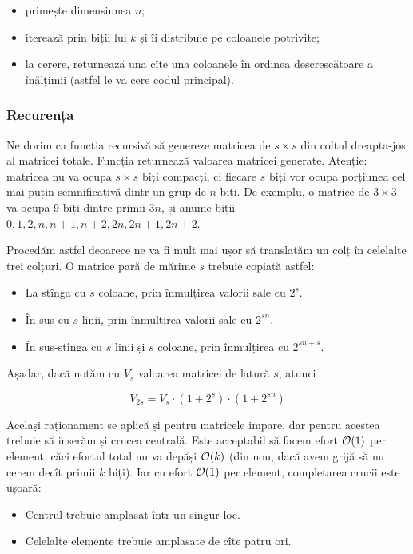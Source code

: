 \documentclass[../main.tex]{subfiles}
\begin{document}
\begin{itemize}
  \item primește dimensiunea $n$;
  \item iterează prin biții lui $k$ și îi distribuie pe coloanele potrivite;
  \item la cerere, returnează una cîte una coloanele în ordinea descrescătoare a înălțimii (astfel le va cere codul principal).
\end{itemize}

\subsubsection*{Recurența}

Ne dorim ca funcția recursivă  să genereze matricea de $s \times s$ din colțul dreapta-jos al matricei totale. Funcția returnează valoarea matricei generate. Atenție: matricea nu va ocupa $s \times s$ biți compacți, ci fiecare $s$ biți vor ocupa porțiunea cel mai puțin semnificativă dintr-un grup de $n$ biți. De exemplu, o matrice de $3 \times 3$ va ocupa $9$ biți dintre primii $3n$, și anume biții $0, 1, 2, n, n + 1, n + 2, 2n, 2n + 1, 2n + 2$.

Procedăm astfel deoarece ne  va fi mult mai ușor să translatăm un colț în celelalte trei colțuri. O matrice pară de mărime $s$ trebuie copiată astfel:

\begin{itemize}
  \item La stînga cu $s$ coloane, prin înmulțirea valorii sale cu $2^s$.
  \item În sus cu $s$ linii, prin înmulțirea valorii sale cu $2^{sn}$.
  \item În sus-stînga cu $s$ linii și $s$ coloane, prin înmulțirea cu $2^{sn + s}$.
\end{itemize}

Așadar, dacă notăm cu $V_s$ valoarea matricei de latură $s$, atunci

$$V_{2s} = V_s \cdot (1 + 2^s) \cdot (1 + 2^{sn})$$

Același raționament se aplică și pentru matricele impare, dar pentru acestea trebuie să inserăm și crucea centrală. Este acceptabil să facem efort $\mathcal{O}(1)$ per element, căci efortul total nu va depăși $\mathcal{O}(k)$ (din nou, dacă avem grijă să nu cerem decît primii $k$ biți). Iar cu efort $\mathcal{O}(1)$ per element, completarea crucii este ușoară:

\begin{itemize}
  \item Centrul trebuie amplasat într-un singur loc.
  \item Celelalte elemente trebuie amplasate de cîte patru ori.
\end{itemize}
\end{document}
